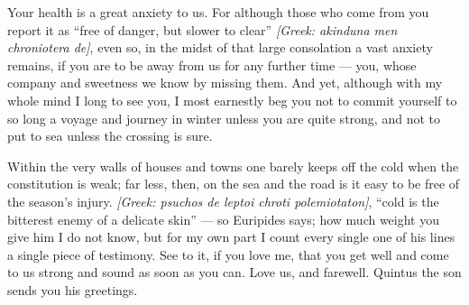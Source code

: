 

 Your health is a great anxiety to us. For although those who come from you report it as ``free of danger, but slower to clear'' \textit{[Greek: akinduna men chroniotera de]}, even so, in the midst of that large consolation a vast anxiety remains, if you are to be away from us for any further time --- you, whose company and sweetness we know by missing them. And yet, although with my whole mind I long to see you, I most earnestly beg you not to commit yourself to so long a voyage and journey in winter unless you are quite strong, and not to put to sea unless the crossing is sure.

 Within the very walls of houses and towns one barely keeps off the cold when the constitution is weak; far less, then, on the sea and the road is it easy to be free of the season's injury. \textit{[Greek: psuchos de leptoi chroti polemiotaton]}, ``cold is the bitterest enemy of a delicate skin'' --- so Euripides says; how much weight you give him I do not know, but for my own part I count every single one of his lines a single piece of testimony. See to it, if you love me, that you get well and come to us strong and sound as soon as you can. Love us, and farewell. Quintus the son sends you his greetings.
